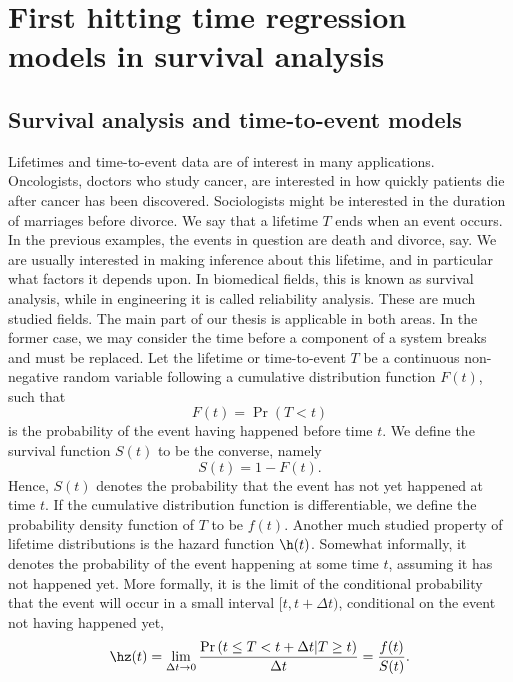 \chapter{First hitting time regression models in survival analysis}

\section{Survival analysis and time-to-event models}\label{sec:survival}
Lifetimes and time-to-event data are of interest in many applications. Oncologists, doctors who study cancer, are interested in how quickly patients die after cancer has been discovered. Sociologists might be interested in the duration of marriages before divorce. We say that a lifetime $T$ ends when an event occurs. In the previous examples, the events in question are death and divorce, say. We are usually interested in making inference about this lifetime, and in particular what factors it depends upon. In biomedical fields, this is known as survival analysis, while in engineering it is called reliability analysis. These are much studied fields. The main part of our thesis is applicable in both areas. In the former case, we may consider the time before a component of a system breaks and must be replaced. Let the lifetime or time-to-event $T$ be a continuous non-negative random variable following a cumulative distribution function $F(t)$, such that
\begin{equation*}%
    F(t)=\Pr(T<t)
\end{equation*}
is the probability of the event having happened before time $t$. We define the survival function $S(t)$ to be the converse, namely
\begin{equation*}%
    S(t)=1-F(t).
\end{equation*}
Hence, $S(t)$ denotes the probability that the event has not yet happened at time $t$. If the cumulative distribution function is differentiable, we define the probability density function of $T$ to be $f(t)$. Another much studied property of lifetime distributions is the hazard function $\h(t)$. Somewhat informally, it denotes the probability of the event happening at some time $t$, assuming it has not happened yet. More formally, it is the limit of the conditional probability that the event will occur in a small interval $[t,t+\Delta t)$, conditional on the event not having happened yet,
\begin{equation*}%
    \hz(t)=\lim_{\Delta t\to 0}\frac{\Pr{(t\leq T<t+\Delta t|T\geq t)}}{\Delta t}=\frac{f(t)}{S(t)}.
\end{equation*}
